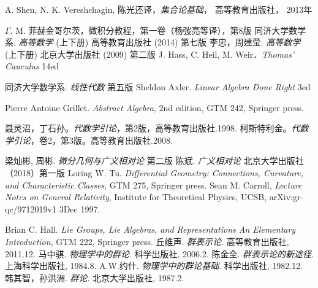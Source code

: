 
\begin{thebibliography}{99}

A. Shen, N. K. Vereshchagin, 陈光还译，\textsl{集合论基础}， 高等教育出版社， 2013年

$\Gamma$. M. 菲赫金哥尔茨，微积分教程，第一卷（杨弢亮等译），第8版
同济大学数学系. \textsl{高等数学} (上下册) 高等教育出版社 (2014) 第七版
李忠，周建莹. \textsl{高等数学} (上下册) 北京大学出版社 (2009) 第二版
J. Hass, C. Heil, M. Weir．\textsl{Thomas' Cauculus} 14ed

同济大学数学系. \textsl{线性代数} 第五版
Sheldon Axler. \textsl{Linear Algebra Done Right} 3ed

Pierre Antoine Grillet. \textsl{Abstract Algebra}, 2nd edition, GTM 242, Springer press. 

聂灵沼，丁石孙。\textsl{代数学引论}，第2版，高等教育出版社.1998.
柯斯特利金。\textsl{代数学引论}，卷2，第3版。高等教育出版社.2008.

梁灿彬, 周彬. \textsl{微分几何与广义相对论} 第二版
陈斌. \textsl{广义相对论} 北京大学出版社（2018）第一版
Loring W. Tu. \textsl{Differential Geometry: Connections, Curvature, and Characteristic Classes}, GTM 275, Springer press. 
Sean M. Carroll, \textsl{Lecture Notes on General Relativity}, Institute for Theoretical Physics, UCSB, arXiv:gr-qc/9712019v1 3Dec 1997. 

Brian C. Hall. \textsl{Lie Groups, Lie Algebras, and Representations An Elementary Introduction}, GTM 222, Springer press. 
丘维声. \textsl{群表示论}. 高等教育出版社, 2011.12.
马中骐. \textsl{物理学中的群论}. 科学出版社, 2006.2.
陈金全. \textsl{群表示论的新途径}. 上海科学出版社, 1984.8.
A.W.约什. \textsl{物理学中的群论基础}. 科学出版社, 1982.12.
韩其智，孙洪洲. \textsl{群论}. 北京大学出版社, 1987.2.


\end{thebibliography}
